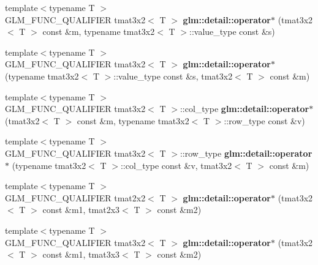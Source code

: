 \begin{DoxyCompactItemize}
\item 
\hypertarget{namespaceglm_1_1detail_a29f8aeeb5e6eb4b49ccfb6eadf7ee8fb}{}{\footnotesize template$<$typename T $>$ }\\G\+L\+M\+\_\+\+F\+U\+N\+C\+\_\+\+Q\+U\+A\+L\+I\+F\+I\+E\+R tmat3x2$<$ T $>$ {\bfseries glm\+::detail\+::operator$\ast$} (tmat3x2$<$ T $>$ const \&m, typename tmat3x2$<$ T $>$\+::value\+\_\+type const \&s)\label{namespaceglm_1_1detail_a29f8aeeb5e6eb4b49ccfb6eadf7ee8fb}

\item 
\hypertarget{namespaceglm_1_1detail_a117d1ab40e3c26f74451b60be666c174}{}{\footnotesize template$<$typename T $>$ }\\G\+L\+M\+\_\+\+F\+U\+N\+C\+\_\+\+Q\+U\+A\+L\+I\+F\+I\+E\+R tmat3x2$<$ T $>$ {\bfseries glm\+::detail\+::operator$\ast$} (typename tmat3x2$<$ T $>$\+::value\+\_\+type const \&s, tmat3x2$<$ T $>$ const \&m)\label{namespaceglm_1_1detail_a117d1ab40e3c26f74451b60be666c174}

\item 
\hypertarget{namespaceglm_1_1detail_a0e828f563c0f567492e21156f0586538}{}{\footnotesize template$<$typename T $>$ }\\G\+L\+M\+\_\+\+F\+U\+N\+C\+\_\+\+Q\+U\+A\+L\+I\+F\+I\+E\+R tmat3x2$<$ T $>$\+::col\+\_\+type {\bfseries glm\+::detail\+::operator$\ast$} (tmat3x2$<$ T $>$ const \&m, typename tmat3x2$<$ T $>$\+::row\+\_\+type const \&v)\label{namespaceglm_1_1detail_a0e828f563c0f567492e21156f0586538}

\item 
\hypertarget{namespaceglm_1_1detail_aaca641543e10424ba6f582a97acd9b3a}{}{\footnotesize template$<$typename T $>$ }\\G\+L\+M\+\_\+\+F\+U\+N\+C\+\_\+\+Q\+U\+A\+L\+I\+F\+I\+E\+R tmat3x2$<$ T $>$\+::row\+\_\+type {\bfseries glm\+::detail\+::operator$\ast$} (typename tmat3x2$<$ T $>$\+::col\+\_\+type const \&v, tmat3x2$<$ T $>$ const \&m)\label{namespaceglm_1_1detail_aaca641543e10424ba6f582a97acd9b3a}

\item 
\hypertarget{namespaceglm_1_1detail_af9e6e1ba1306b20d1b8b2b8a6eecade5}{}{\footnotesize template$<$typename T $>$ }\\G\+L\+M\+\_\+\+F\+U\+N\+C\+\_\+\+Q\+U\+A\+L\+I\+F\+I\+E\+R tmat2x2$<$ T $>$ {\bfseries glm\+::detail\+::operator$\ast$} (tmat3x2$<$ T $>$ const \&m1, tmat2x3$<$ T $>$ const \&m2)\label{namespaceglm_1_1detail_af9e6e1ba1306b20d1b8b2b8a6eecade5}

\item 
\hypertarget{namespaceglm_1_1detail_a9ceb24f5980ad27a0731977d687dbcd7}{}{\footnotesize template$<$typename T $>$ }\\G\+L\+M\+\_\+\+F\+U\+N\+C\+\_\+\+Q\+U\+A\+L\+I\+F\+I\+E\+R tmat3x2$<$ T $>$ {\bfseries glm\+::detail\+::operator$\ast$} (tmat3x2$<$ T $>$ const \&m1, tmat3x3$<$ T $>$ const \&m2)\label{namespaceglm_1_1detail_a9ceb24f5980ad27a0731977d687dbcd7}


\end{DoxyCompactItemize}
